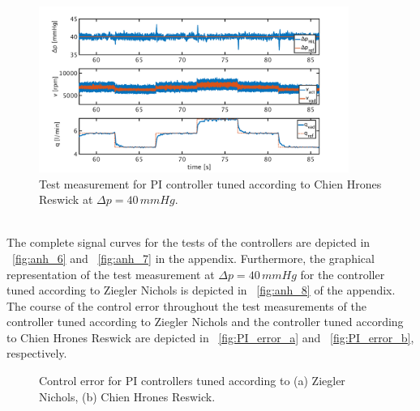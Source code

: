 \begin{figure}[ht]
  \centering
  \includegraphics[width=0.9\textwidth]{images/chapt_5/pi_contr_chr_40.pdf}
  \caption[Test measurement for PI controller tuned according to Chien Hrones Reswick at $\Delta{p}=40\,mmHg$]{Test measurement for PI controller tuned according to Chien Hrones Reswick at $\Delta{p}=40\,mmHg$.}
  \label{fig:pi_contr_chr_40}
\end{figure}
\\The complete signal curves for the tests of the controllers are depicted in \figurename~\ref{fig:anh_6} and \figurename~\ref{fig:anh_7} in the appendix. Furthermore, the graphical representation of the test measurement at $\Delta{p}=40\,mmHg$ for the controller tuned according to Ziegler Nichols is depicted in \figurename~\ref{fig:anh_8} of the appendix.
\\The course of the control error throughout the test measurements of the controller tuned according to Ziegler Nichols and the controller tuned according to Chien Hrones Reswick are depicted in \figurename~\ref{fig:PI_error_a} and \figurename~\ref{fig:PI_error_b}, respectively.
\begin{figure}[ht]
  \centering
  \caption[Control error for PI Controllers]{Control error for PI controllers tuned according to (a) Ziegler Nichols, (b) Chien Hrones Reswick.}
  \label{fig:PI_error}
\end{figure}

